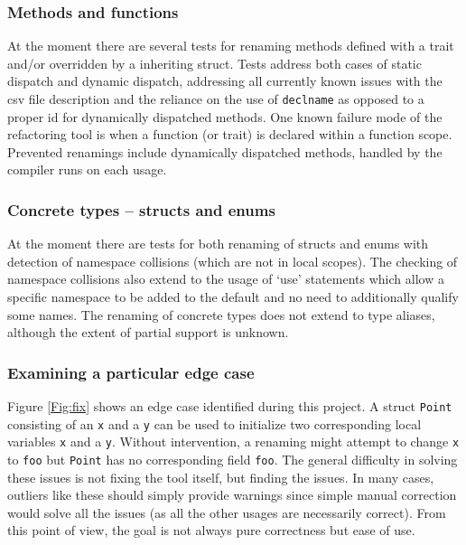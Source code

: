 
\subsubsection{Methods and functions}
At the moment there are several tests for renaming methods defined with a trait and/or overridden by a inheriting struct. Tests address both cases of static dispatch and dynamic dispatch, addressing all currently known issues with the csv file description and the reliance on the use of {\verb|declname|} as opposed to a proper id for dynamically dispatched methods. One known failure mode of the refactoring tool is when a function (or trait) is declared within a function scope. Prevented renamings include dynamically dispatched methods, handled by the compiler runs on each usage.

\subsubsection{Concrete types -- structs and enums}
At the moment there are tests for both renaming of structs and enums with detection of namespace collisions (which are not in local scopes). The checking of namespace collisions also extend to the usage of `use' statements which allow a specific namespace to be added to the default and no need to additionally qualify some names. The renaming of concrete types does not extend to type aliases, although the extent of partial support is unknown.

\subsubsection{Examining a particular edge case}
Figure \ref{Fig:fix} shows an edge case identified during this project. A struct {\verb|Point|} consisting of an {\verb|x|} and a {\verb|y|} can be used to initialize two corresponding local variables {\verb|x|} and a {\verb|y|}. Without intervention, a renaming might attempt to change {\verb|x|} to  {\verb|foo|} but {\verb|Point|} has no corresponding field {\verb|foo|}. The general difficulty in solving these issues is not fixing the tool itself, but finding the issues. In many cases, outliers like these should simply provide warnings since simple manual correction would solve all the issues (as all the other usages are necessarily correct). From this point of view, the goal is not always pure correctness but ease of use.

